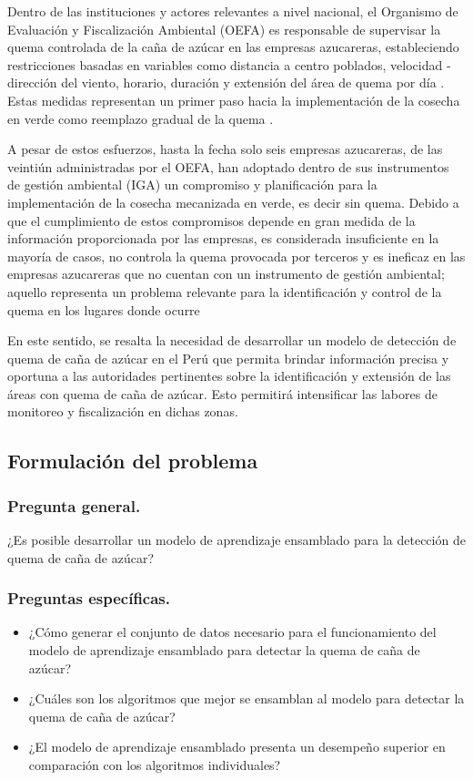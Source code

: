 Dentro de las instituciones y actores relevantes a nivel nacional, el Organismo de Evaluación y Fiscalización Ambiental (OEFA) es responsable de supervisar la quema controlada de la caña de azúcar en las empresas azucareras, estableciendo restricciones basadas en variables 
como distancia a centro poblados, velocidad - dirección del viento, horario, duración y extensión del área de quema por día \citep{oefa_canazucar_2023}. Estas medidas representan un primer paso hacia la implementación de la cosecha en verde como reemplazo gradual de la quema
\citep{agrolmos_sa_modificacion_2021,agroaurora_sac_actualizacion_2020}.

A pesar de estos esfuerzos, hasta la fecha solo seis empresas azucareras, de las veintiún administradas por el OEFA, han adoptado dentro de sus instrumentos
de gestión ambiental (IGA) un compromiso y planificación para la implementación de la cosecha mecanizada en verde, es decir sin quema. Debido a que el cumplimiento de estos compromisos depende en gran medida de la información 
proporcionada por las empresas, es considerada insuficiente en la mayoría de casos, no controla la quema provocada por terceros y es ineficaz en las empresas azucareras que no cuentan con un instrumento de gestión ambiental; aquello representa
un problema relevante para la identificación y control de la quema en los lugares donde ocurre \citep[pp. 1530 - 1536]{casa_grande_saa_2018}

En este sentido, se resalta la necesidad de desarrollar un modelo de detección de quema de caña de azúcar en el Perú que permita brindar información precisa y oportuna a las autoridades pertinentes sobre la identificación y extensión de las áreas 
con quema de caña de azúcar. Esto permitirá intensificar las labores de monitoreo y fiscalización en dichas zonas.

\subsection{Formulación del problema}
\subsubsection{Pregunta general.}
¿Es posible desarrollar un modelo de aprendizaje ensamblado para la detección de quema de caña de azúcar?
\subsubsection{Preguntas específicas.}
\begin{itemize}
    \item ¿Cómo generar el conjunto de datos necesario para el funcionamiento del modelo de aprendizaje ensamblado para detectar la quema de caña de azúcar?
    \item ¿Cuáles son los algoritmos que mejor se ensamblan al modelo para detectar la quema de caña de azúcar?
    \item ¿El modelo de aprendizaje ensamblado presenta un desempeño superior en comparación con los algoritmos individuales?
\end{itemize}